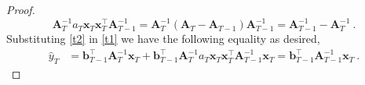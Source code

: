 \begin{proof}
\begin{equation}
\mathbf{A}_{T}^{-1}a_{T}\mathbf{x}_{T}\mathbf{x}_{T}^{\top}\mathbf{A}_{T-1}^{-1}=\mathbf{A}_{T}^{-1}\left(\mathbf{A}_{T}-\mathbf{A}_{T-1}\right)\mathbf{A}_{T-1}^{-1}=\mathbf{A}_{T-1}^{-1}-\mathbf{A}_{T}^{-1}\label{t2}~.
\end{equation}
Substituting \eqref{t2} in \eqref{t1} we have the following equality
as desired,
\begin{align}
\hat{y}_{T} & =  \mathbf{b}_{T-1}^{\top}\mathbf{A}_{T}^{-1}\mathbf{x}_{T}+\mathbf{b}_{T-1}^{\top}\mathbf{A}_{T}^{-1}a_{T}\mathbf{x}_{T}\mathbf{x}_{T}^{\top}\mathbf{A}_{T-1}^{-1}\mathbf{x}_{T}
  =  \mathbf{b}_{T-1}^{\top}\mathbf{A}_{T-1}^{-1}\mathbf{x}_{T}~. \label{t3_thm}
\end{align}


\end{proof}
